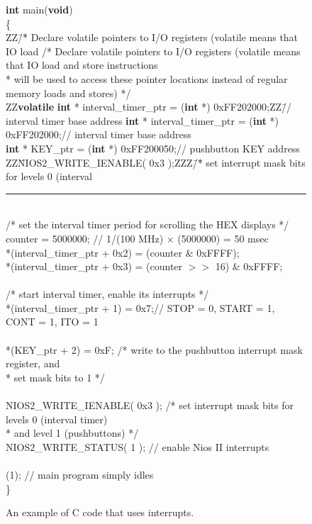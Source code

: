 \begin{figure}[h!]
\begin{center}
\begin{minipage}[t]{12.5 cm}
\begin{tabbing}
{\bf int} main({\bf void})\\
\{\\
ZZ\=/\=* Declare volatile pointers to I/O registers (volatile means that IO load\kill
\>/* Declare volatile pointers to I/O registers (volatile means that IO load and store instructions\\
\>\>* will be used to access these pointer locations instead of regular memory loads and stores) */\\
ZZ\={\bf volatile} {\bf int} * interval\_timer\_ptr = ({\bf int} *) 0xFF202000;ZZ\=// interval timer base address\kill
{} {\bf int} * interval\_timer\_ptr = ({\bf int} *) 0xFF202000;\>// interval timer base address\\
 {\bf int} * KEY\_ptr = ({\bf int} *) 0xFF200050;\>// pushbutton KEY address\\
ZZ\=NIOS2\_WRITE\_IENABLE( 0x3 );ZZZ\=/\=* set interrupt mask bits for levels 0 (interval\kill
\rule{6.0in}{0in}~\\
\>/* set the interval timer period for scrolling the HEX displays */\\
 counter = 5000000; \>// 1/(100 MHz) $\times$ (5000000) = 50 msec\\
\>*(interval\_timer\_ptr + 0x2) = (counter \& 0xFFFF);\\
\>*(interval\_timer\_ptr + 0x3) = (counter $>>$ 16) \& 0xFFFF;\\
~\\
\>/* start interval timer, enable its interrupts */\\
\>*(interval\_timer\_ptr + 1) = 0x7;\>// STOP = 0, START = 1, CONT = 1, ITO = 1 \\
~\\
\>*(KEY\_ptr + 2) = 0xF; \>/* write to the pushbutton interrupt mask register, and\\
\>\>\>* set mask bits to 1 */\\
~\\
\>NIOS2\_WRITE\_IENABLE( 0x3 ); \>/* set interrupt mask bits for levels 0 (interval timer)\\
\>\>* and level 1 (pushbuttons) */\\
\>NIOS2\_WRITE\_STATUS( 1 ); \>// enable Nios II interrupts\\
~\\
(1); \>// main program simply idles\\
\}\\
\end{tabbing}
\end{minipage}
\end{center}
	\vspace{-0.33in}\caption{An example of C code that uses interrupts.}
   \label{fig:interrupt_example_C}
\end{figure}
